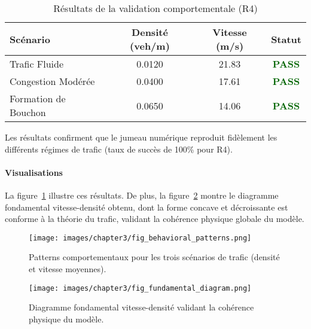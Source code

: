 \begin{table}[htbp]
    \centering
    \caption{Résultats de la validation comportementale (R4)}
    \label{tab:results_R4_behavioral}
    \begin{tabular}{lccc}
        \toprule
        \textbf{Scénario}    & \textbf{Densité (veh/m)} & \textbf{Vitesse (m/s)} & \textbf{Statut}                      \\
        \midrule
        Trafic Fluide        & 0.0120                   & 21.83                  & \textcolor{darkgreen}{\textbf{PASS}} \\
        Congestion Modérée   & 0.0400                   & 17.61                  & \textcolor{darkgreen}{\textbf{PASS}} \\
        Formation de Bouchon & 0.0650                   & 14.06                  & \textcolor{darkgreen}{\textbf{PASS}} \\
        \bottomrule
    \end{tabular}
\end{table}



Les résultats confirment que le jumeau numérique reproduit fidèlement les différents régimes de trafic (taux de succès de 100\% pour R4).

\paragraph{Visualisations}

La figure~\ref{fig:behavioral_patterns} illustre ces résultats. De plus, la figure~\ref{fig:fundamental_diagram} montre le diagramme fondamental vitesse-densité obtenu, dont la forme concave et décroissante est conforme à la théorie du trafic, validant la cohérence physique globale du modèle.

\begin{figure}[htbp]
    \centering
    \texttt{[image: images/chapter3/fig\_behavioral\_patterns.png]}
    \caption{Patterns comportementaux pour les trois scénarios de trafic (densité et vitesse moyennes).}
    \label{fig:behavioral_patterns}
\end{figure}



\begin{figure}[htbp]
    \centering
    \texttt{[image: images/chapter3/fig\_fundamental\_diagram.png]}
    \caption{Diagramme fondamental vitesse-densité validant la cohérence physique du modèle.}
    \label{fig:fundamental_diagram}
\end{figure}

